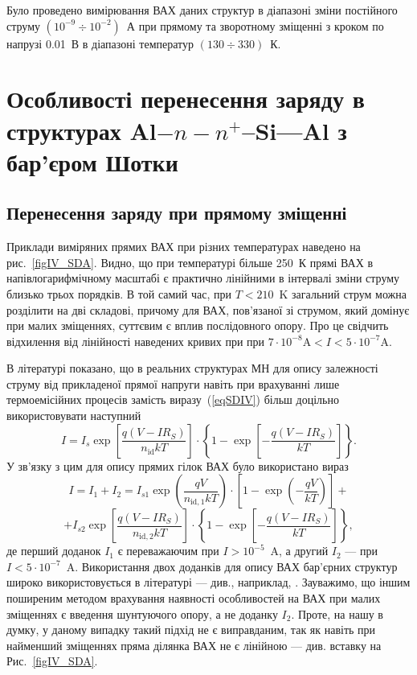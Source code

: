 Було проведено вимірювання ВАХ даних структур в діапазоні зміни постійного струму $(10^{-9}\div10^{-2})$~А при
прямому та зворотному зміщенні з кроком по напрузі 0.01~В в діапазоні температур $(130\div330)$~К.


\section{Особливості перенесення заряду в структурах Al$-n-n^+$--Si---Al з бар'єром Шотки\label{MSSi_Non}}
\subsection{Перенесення заряду при прямому зміщенні\label{sbMSSi_NonF}}


Приклади виміряних прямих ВАХ при різних температурах наведено на рис.~\ref{figIV_SDA}.
Видно, що при температурі більше 250~К прямі ВАХ в напівлогарифмічному масштабі є практично лінійними в інтервалі зміни струму близько трьох порядків.
В той самий час, при $T<210$~K загальний струм можна розділити на дві складові, причому для ВАХ, пов'язаної зі струмом,
який домінує при малих зміщеннях, суттєвим є вплив послідовного опору.
Про це свідчить відхилення від лінійності наведених кривих при при $7\cdot10^{-8}\mbox{A}<I<5\cdot10^{-7}\mbox{A}$.

В літературі \cite{Rhoderick1988,Gromov,Sze2012} показано, що в реальних структурах МН для опису залежності струму від прикладеної прямої напруги
навіть при врахуванні лише термоемісійних процесів замість виразу~(\ref{eqSDIV}) більш доцільно використовувати наступний
\begin{equation}
\label{eqSDIV:2}
I=I_s\exp\left[\frac{q(V-IR_S)}{n_\mathrm{id}kT}\right]\cdot
\left\{1-\exp\left[-\frac{q(V-IR_S)}{kT}\right]\right\}.
\end{equation}
У зв'язку з цим для опису прямих гілок ВАХ було використано вираз
\[
I=I_1+I_2=I_{s1}\exp{\left(\frac{qV}{n_{\mathrm{id},1}kT}\right)}\cdot
\left[1-\exp{\left(-\frac{qV}{kT}\right)}\right]+\]
\begin{equation} \label{eqSDA_IV}
+I_{s2}\exp\left[\frac{q(V-IR_S)}{n_{\mathrm{id},2}kT}\right]\cdot
\left\{1-\exp\left[-\frac{q(V-IR_S)}{kT}\right]\right\},
\end{equation}
де перший доданок $I_1$ є переважаючим при $I>10^{-5}$~A, а другий $I_2$ --- при $I<5\cdot10^{-7}$~A.
Використання двох доданків для опису ВАХ бар'єрних структур широко використовується
в літературі --- див., наприклад, \cite{Arslan,Donoval2010,Huang,GELCZUK2014}.
Зауважимо, що іншим поширеним методом врахування наявності особливостей на ВАХ при малих зміщеннях є введення шунтуючого опору, а не доданку $I_2$.
Проте, на нашу в думку, у даному випадку такий підхід не є виправданим, так як навіть при найменший зміщеннях пряма ділянка ВАХ не є лінійною --- див. вставку на Рис.~\ref{figIV_SDA}.

